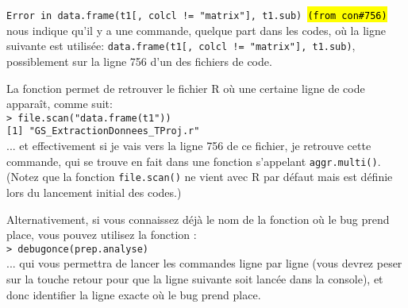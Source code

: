 \documentclass{article}
\begin{document}
\texttt{Error in data.frame(t1[, colcl != "matrix"], t1.sub)
\hl{(from con\#756)}}\\

nous indique qu'il y a une commande, quelque part dans les codes, où
la ligne suivante est utilisée: \texttt{data.frame(t1[, colcl !=
  "matrix"], t1.sub)}, possiblement sur la ligne 756 d'un des fichiers
de code.

La fonction  permet de retrouver le fichier R où
une certaine ligne de code apparaît, comme suit: \\
\texttt{> file.scan("data.frame(t1"))}\\
\texttt{[1] "GS\_ExtractionDonnees\_TProj.r"}\\

... et effectivement si je vais vers la ligne 756 de ce fichier, je
retrouve cette commande, qui se trouve en fait dans une fonction
s'appelant \texttt{aggr.multi()}. (Notez que la fonction \texttt{file.scan()}
ne vient avec R par défaut mais est définie lors du lancement initial
des codes.)

Alternativement, si vous connaissez déjà le nom de la fonction où le
bug prend place, vous pouvez utilisez la fonction
:\\
\texttt{> debugonce(prep.analyse)}\\

... qui vous permettra de lancer les commandes ligne par ligne (vous
devrez peser sur la touche retour pour que la ligne suivante soit
lancée dans la console), et donc identifier la ligne exacte où le bug
prend place.
\end{document}
